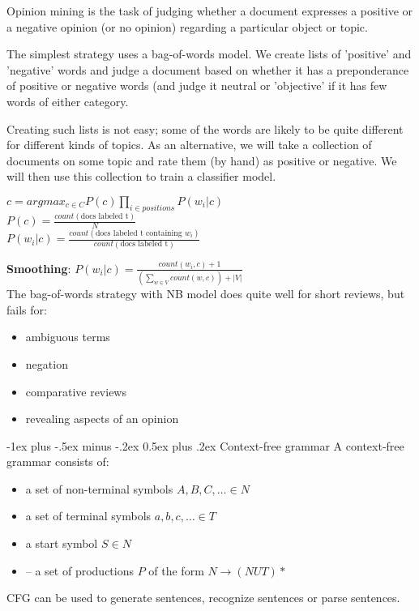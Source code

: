 \documentclass[10pt,landscape]{article}
\makeatletter
\renewcommand{\section}{\@startsection{section}{1}{0mm}%
                                {-1ex plus -.5ex minus -.2ex}%
                                {0.5ex plus .2ex}%
                                {\normalfont\large\bfseries}}
\makeatother
\begin{document}
\begin{multicols}{3}
Opinion mining is the task of judging whether a document expresses a positive or a negative opinion (or no opinion) regarding a particular object or topic. 

The simplest strategy uses a bag-of-words model. We create lists of 'positive' and 'negative' words and judge a document based on whether it has a preponderance of positive or negative words (and judge it neutral or 'objective' if it has few words of either category.

Creating such lists is not easy; some of the words are likely to be quite different for different kinds of topics. As an alternative, we will take a collection of documents on some topic and rate them (by hand) as positive or negative. We will then use this collection to train a classifier model.

$
c = argmax_{c \in C} P(c) \prod_{i \in positions} P(w_i | c)	 
$ \\

$P(c) = \frac{count(\text{docs labeled t})}{N}$ \\

$P(w_i | c) = \frac{count(\text{docs labeled t containing } w_i)}{count(\text{docs labeled t})}$

\textbf{Smoothing}: $P(w_i | c) = \frac{count(w_i, c) + 1}{(\sum_{w \in V} count(w,c)) + |V|}$ \\

The bag-of-words strategy with NB model does quite well for short reviews, but fails for:
\begin{itemize}
	\item ambiguous terms
	\item negation
	\item comparative reviews
	\item revealing aspects of an opinion
\end{itemize}


\section{Context-free grammar}
A context-free grammar consists of:
\begin{itemize}
	\item a set of non-terminal symbols $A, B, C, \dots \in N$
	\item a set of terminal symbols $a, b, c, \dots \in T$
	\item a start symbol $S \in N$
	\item – a set of productions $P$ of the form $N \rightarrow (N U T)*$
\end{itemize}
CFG can be used to generate sentences, recognize sentences or parse sentences.


\end{multicols}
\end{document}
